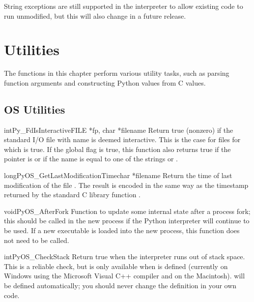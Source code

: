 \documentclass{manual}
\begin{document}
String exceptions are still supported in the interpreter to allow
existing code to run unmodified, but this will also change in a future 
release.


\chapter{Utilities \label{utilities}}

The functions in this chapter perform various utility tasks, such as
parsing function arguments and constructing Python values from C
values.

\section{OS Utilities \label{os}}

\begin{cfuncdesc}{int}{Py_FdIsInteractive}{FILE *fp, char *filename}
Return true (nonzero) if the standard I/O file  with name
 is deemed interactive.  This is the case for files for
which  is true.  If the global flag
 is true, this function also returns true if
the  pointer is \NULL{} or if the name is equal to one of
the strings  or .
\end{cfuncdesc}

\begin{cfuncdesc}{long}{PyOS_GetLastModificationTime}{char *filename}
Return the time of last modification of the file .
The result is encoded in the same way as the timestamp returned by
the standard C library function .
\end{cfuncdesc}

\begin{cfuncdesc}{void}{PyOS_AfterFork}{}
Function to update some internal state after a process fork; this
should be called in the new process if the Python interpreter will
continue to be used.  If a new executable is loaded into the new
process, this function does not need to be called.
\end{cfuncdesc}

\begin{cfuncdesc}{int}{PyOS_CheckStack}{}
Return true when the interpreter runs out of stack space.  This is a
reliable check, but is only available when  is
defined (currently on Windows using the Microsoft Visual C++ compiler
and on the Macintosh).   will be defined
automatically; you should never change the definition in your own
code.
\end{cfuncdesc}
\end{document}
